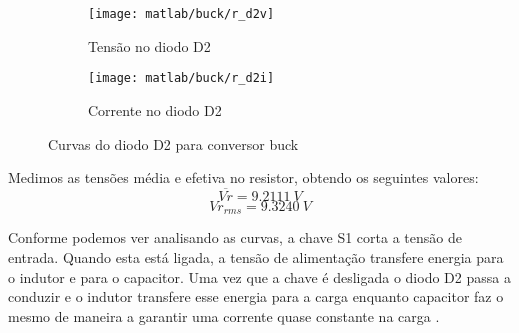 \documentclass{article}
\begin{document}
\begin{figure}[H]
	\centering
	\begin{subfigure}[b]{0.4\linewidth}
		\texttt{[image: matlab/buck/r\_d2v]}
		\caption{Tensão no diodo D2}
	\end{subfigure}
	\begin{subfigure}[b]{0.4\linewidth}
		\centering
		\texttt{[image: matlab/buck/r\_d2i]}
		\caption{Corrente no diodo D2}
	\end{subfigure}
	\caption{Curvas do diodo D2 para conversor buck}
	\label{fig:bd2}
\end{figure}

Medimos as tensões média e efetiva no resistor, obtendo os seguintes valores:
\begin{equation}
\overline{Vr} = 9.2111\ V
\end{equation}
\begin{equation}
Vr_{rms} = 9.3240\ V
\end{equation}

Conforme podemos ver analisando as curvas, a chave S1 corta a tensão de entrada. Quando esta está ligada, a tensão de alimentação transfere energia para o indutor e para o capacitor. Uma vez que a chave é desligada o diodo D2 passa a conduzir e o indutor transfere esse energia para a carga enquanto capacitor faz o mesmo de maneira a garantir uma corrente quase constante na carga \cite{bb:dcdc}.
\end{document}
